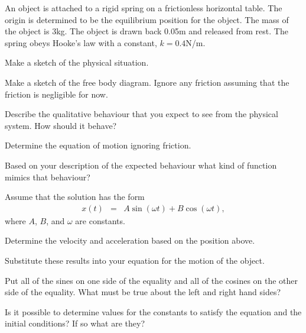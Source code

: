 \begin{problem}

\item An object is attached to a rigid spring on a frictionless
  horizontal table. The origin is determined to be the equilibrium
  position for the object. The mass of the object is 3kg. The object
  is drawn back 0.05m and released from rest. The spring obeys Hooke's
  law with a constant, $k=0.4$N/m.
  \begin{subproblem}
    \item Make a sketch of the physical situation.
      \vfill
    \item Make a sketch of the free body diagram. Ignore any friction
      assuming that the friction is negligible for now.
      \vfill
    \item Describe the qualitative behaviour that you expect to see
      from the physical system. How should it behave?
      \vfill
    \item Determine the equation of motion ignoring friction.
      \vfill

    \item Based on your description of the expected behaviour what
      kind of function mimics that behaviour?
      \vspace{3em}

      \clearpage

    \item Assume that the solution has the form
      \begin{eqnarray*}
        x(t) & = & A \sin(\omega t) + B \cos(\omega t),
      \end{eqnarray*}
      where $A$, $B$, and $\omega$ are constants. 
      \begin{subproblem}
      \item Determine the velocity and acceleration based on the
        position above.  
        \vfill
      \item Substitute these results into your equation for the motion
        of the object.
        \vfill
        \clearpage
      \item Put all of the sines on one side of the equality and all
        of the cosines on the other side of the equality. What must be
        true about the left and right hand sides?
        \vspace{6em}
      \item Is it possible to determine values for the constants to
        satisfy the equation and the initial conditions? If so what
        are they?
        \vfill
      \end{subproblem}

  \end{subproblem}
\end{problem}

